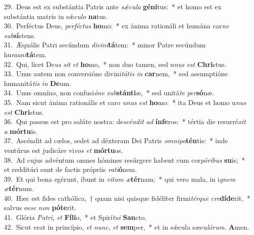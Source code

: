 {29.~}Deus est ex substántia Patris ante \textit{sǽ}\textit{cu}\textit{la} \textbf{gé}\textbf{ni}tus:~* et homo est ex substántia matris in sǽ\textit{cu}\textit{lo} \textbf{na}tus.\\
{30.~}Perféctus Deus, \textit{per}\textit{fé}\textit{ctus} \textbf{ho}mo:~* ex ánima rationáli et humána car\textit{ne} \textit{sub}\textbf{sí}stens.\\
{31.~}Æquális Patri secúndum \textit{di}\textit{vi}\textit{ni}\textbf{tá}tem:~* minor Patre secúndum hu\textit{ma}\textit{ni}\textbf{tá}tem.\\
{32.~}Qui, licet De\textit{us} \textit{sit} \textit{et} \textbf{ho}mo,~* non duo tamen, sed u\textit{nus} \textit{est} \textbf{Chri}stus.\\
{33.~}Unus autem non conversióne divini\textit{tá}\textit{tis} \textit{in} \textbf{car}nem,~* sed assumptióne humanitá\textit{tis} \textit{in} \textbf{De}um.\\
{34.~}Unus omníno, non confusi\textit{ó}\textit{ne} \textit{sub}\textbf{stán}\textbf{ti}æ,~* sed unitá\textit{te} \textit{per}\textbf{só}næ.\\
{35.~}Nam sicut ánima rationális et caro \textit{u}\textit{nus} \textit{est} \textbf{ho}mo:~* ita Deus et homo u\textit{nus} \textit{est} \textbf{Chri}stus.\\
{36.~}Qui passus est pro salúte nostra: de\textit{scén}\textit{dit} \textit{ad} \textbf{ín}\textbf{fe}ros:~* tértia die resurré\textit{xit} \textit{a} \textbf{mór}\textbf{tu}is.\\
{37.~}Ascéndit ad cælos, sedet ad déxteram Dei Patris \textit{om}\textit{ni}\textit{po}\textbf{tén}tis:~* inde ventúrus est judicáre vi\textit{vos} \textit{et} \textbf{mór}\textbf{tu}os.\\
{38.~}Ad cujus advéntum omnes hómines resúrgere habent cum cor\textit{pó}\textit{ri}\textit{bus} \textbf{su}is;~* et redditúri sunt de factis própriis \textit{ra}\textit{ti}\textbf{ó}nem.\\
{39.~}Et qui bona egérunt, ibunt in \textit{vi}\textit{tam} \textit{æ}\textbf{tér}nam:~* qui vero mala, in i\textit{gnem} \textit{æ}\textbf{tér}num.\\
{40.~}Hæc est fides cathólica,~† quam nisi quisque fidéliter firmi\textit{tér}\textit{que} \textit{cre}\textbf{dí}\textbf{de}rit,~* salvus es\textit{se} \textit{non} \textbf{pó}\textbf{te}rit.\\
{41.~}Glória \textit{Pa}\textit{tri}, \textit{et} \textbf{Fí}\textbf{li}o,~* et Spirí\textit{tu}\textit{i} \textbf{San}cto.\\
{42.~}Sicut erat in princípio, \textit{et} \textit{nunc}, \textit{et} \textbf{sem}per,~* et in sǽcula sæcu\textit{ló}\textit{rum}. \textbf{A}men.\\
